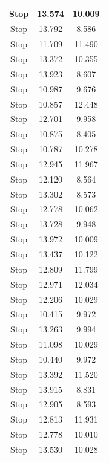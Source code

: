 \begin{longtable}{|c|c|c|}
  Stop           & 13.574              & 10.009           \\ \hline
  Stop           & 13.792              & 8.586            \\ \hline
  Stop           & 11.709              & 11.490           \\ \hline
  Stop           & 13.372              & 10.355           \\ \hline
  Stop           & 13.923              & 8.607            \\ \hline
  Stop           & 10.987              & 9.676            \\ \hline
  Stop           & 10.857              & 12.448           \\ \hline
  Stop           & 12.701              & 9.958            \\ \hline
  Stop           & 10.875              & 8.405            \\ \hline
  Stop           & 10.787              & 10.278           \\ \hline
  Stop           & 12.945              & 11.967           \\ \hline
  Stop           & 12.120              & 8.564            \\ \hline
  Stop           & 13.302              & 8.573            \\ \hline
  Stop           & 12.778              & 10.062           \\ \hline
  Stop           & 13.728              & 9.948            \\ \hline
  Stop           & 13.972              & 10.009           \\ \hline
  Stop           & 13.437              & 10.122           \\ \hline
  Stop           & 12.809              & 11.799           \\ \hline
  Stop           & 12.971              & 12.034           \\ \hline
  Stop           & 12.206              & 10.029           \\ \hline
  Stop           & 10.415              & 9.972            \\ \hline
  Stop           & 13.263              & 9.994            \\ \hline
  Stop           & 11.098              & 10.029           \\ \hline
  Stop           & 10.440              & 9.972            \\ \hline
  Stop           & 13.392              & 11.520           \\ \hline
  Stop           & 13.915              & 8.831            \\ \hline
  Stop           & 12.905              & 8.593            \\ \hline
  Stop           & 12.813              & 11.931           \\ \hline
  Stop           & 12.778              & 10.010           \\ \hline
  Stop           & 13.530              & 10.028           \\ \hline
\end{longtable}

